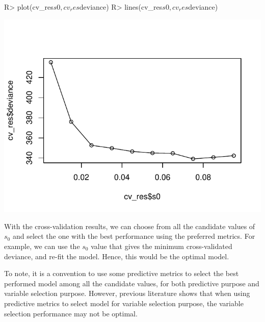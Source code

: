 \documentclass[
]{jss}
\begin{document}
\begin{CodeChunk}
\begin{CodeInput}
R> plot(cv_res$s0, cv_res$deviance)
R> lines(cv_res$s0, cv_res$deviance)
\end{CodeInput}


\begin{center}\includegraphics{BHAM_software_files/figure-latex/unnamed-chunk-9-1} \end{center}

\end{CodeChunk}

With the cross-validation results, we can choose from all the candidate
values of \(s_0\) and select the one with the best performance using the
preferred metrics. For example, we can use the \(s_0\) value that gives
the minimum cross-validated deviance, and re-fit the model. Hence, this
would be the optimal model.

\begin{CodeChunk}
\end{CodeChunk}

To note, it is a convention to use some predictive metrics to select the
best performed model among all the candidate values, for both predictive
purpose and variable selection purpose. However, previous literature
shows that when using predictive metrics to select model for variable
selection purpose, the variable selection performance may not be
optimal.
\end{document}
